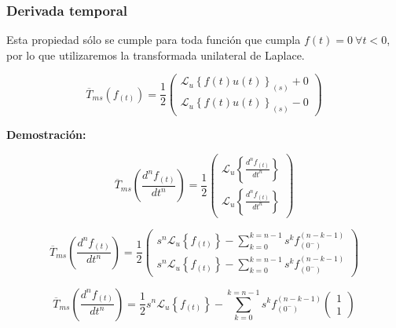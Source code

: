 \documentclass[12pt]{article}
\begin{document}
\subsubsection{Derivada temporal}

Esta propiedad sólo se cumple para toda función que cumpla $f(t) = 0 \ \forall t < 0$, por lo que utilizaremos la transformada unilateral de Laplace.

$$
\overline{T}_{ms}(f_{(t)}) = \frac12
\begin{pmatrix}
\mathcal{L}_u\left\{f(t)u(t)\right\}_{(s)} +  0\\[0.2 cm]
\mathcal{L}_u\left\{f(t)u(t)\right\}_{(s)} - 0
\end{pmatrix}
$$

\bfseries{Demostración:}

$$\overline{T}_{ms}\left(\frac{d^n f_{(t)}}{dt^n}\right) = \frac12
\begin{pmatrix}
\mathcal{L}_u\left\{\frac{d^n f_{(t)}}{dt^n}\right\}\\[0.2 cm]
\mathcal{L}_u\left\{\frac{d^n f_{(t)}}{dt^n}\right\}
\end{pmatrix}
$$

$$\overline{T}_{ms}\left(\frac{d^n f_{(t)}}{dt^n}\right) = \frac12
\begin{pmatrix}
s^n\mathcal{L}_u\left\{f_{(t)}\right\} -\sum\limits_{k=0}^{k=n-1} s^k f^{(n-k-1)}_{(0^-)}\\[0.5 cm]
s^n\mathcal{L}_u\left\{f_{(t)}\right\} -\sum\limits_{k=0}^{k=n-1} s^k f^{(n-k-1)}_{(0^-)}
\end{pmatrix}
$$

$$\overline{T}_{ms}\left(\frac{d^n f_{(t)}}{dt^n}\right) = \frac12 s^n\mathcal{L}_u\left\{f_{(t)}\right\} -\sum\limits_{k=0}^{k=n-1} s^k f^{(n-k-1)}_{(0^-)}
\begin{pmatrix}
1\\
1
\end{pmatrix}
$$
\end{document}
